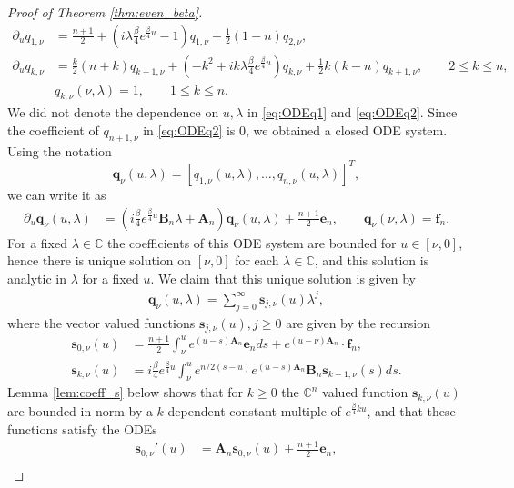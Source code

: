 \documentclass[12pt]{article}
\theoremstyle{definition} %
\newcommand{\CC}{{\mathbb C}}
\theoremstyle{remark} %
\begin{document}
\begin{proof}[Proof of Theorem \ref{thm:even_beta}]
\begin{align}
    \partial_u q_{1,\nu}&=\frac{n+1}{2}+(i \lambda \tfrac{\beta}{4}e^{\frac{\beta}{4}u}-1) q_{1,\nu}+\frac{1}{2}(1-n)q_{2,\nu},\\\label{eq:ODEq2}
    \partial_u q_{k,\nu}&=\frac{k}{2} (n +k) q_{k-1,\nu}+(-k^2 + i k \lambda \tfrac{\beta}{4}e^{\frac{\beta}{4}u})q_{k,\nu}+\frac{1}{2} k (k-n )q_{k+1,\nu}, \qquad 2\le k\le n,\\[3pt]
   &q_{k,\nu}(\nu,\lambda)=1, \qquad 1\le k\le n. 
\end{align}
We did not denote the dependence on $u,\lambda$ in \eqref{eq:ODEq1} and \eqref{eq:ODEq2}. 
Since the coefficient 
of $q_{n+1,\nu}$ in \eqref{eq:ODEq2} is 0,   we obtained a closed ODE system.
Using the notation
\[
\mathbf{q}_{\nu}(u,\lambda)=[q_{1,\nu}(u,\lambda), \dots, q_{n,\nu}(u,\lambda)]^T,
\]
we can write it as 
\begin{align}\label{eq:q_nu_ODE}
     \partial_u \mathbf{q}_\nu(u,\lambda) &= (i \tfrac{\beta}{4}e^{\frac{\beta}{4}u} \mathbf{B}_n \lambda  +\mathbf{A}_n) \mathbf{q}_\nu(u,\lambda) +\frac{n+1}{2}\mathbf{e}_n, \qquad
     \mathbf{q}_{\nu}(\nu,\lambda) = \mathbf{f}_n.
\end{align}
For a fixed $\lambda\in \CC$ the coefficients of this ODE system are bounded for $u\in [\nu,0]$, hence there is unique solution on $[\nu,0]$ for each $\lambda\in \CC$, and this solution is analytic in $\lambda$ for a fixed $u$. We claim that this unique solution is given by 
\begin{align}
    \mathbf{q}_\nu(u,\lambda)=\sum_{j=0}^\infty \mathbf{s}_{j,\nu}(u)\lambda^j,\label{eq:q_nu_series}
\end{align}
where the vector valued functions $\mathbf{s}_{j,\nu}(u),j\ge 0$ are  given by the recursion  
\begin{align}\label{eq:s_nu_def1}
    \mathbf{s}_{0,\nu}(u) &=\frac{n+1}{2}\int_\nu^u e^{(u-s)\mathbf{A}_n} \mathbf{e}_nds+e^{(u-\nu) \mathbf{A}_n }\cdot \mathbf{f}_n,\\
    \mathbf{s}_{k,\nu}(u) &= i \frac{\beta}{4}e^{\frac{\beta}{4} u}\int_\nu^ue^{n/2 (s-u)}e^{(u-s)\mathbf{A}_n}\mathbf{B}_n \mathbf{s}_{k-1,\nu}(s)ds.\label{eq:s_nu_def2}
\end{align}
Lemma \ref{lem:coeff_s} below shows that for $k\ge 0$ the $\CC^n$ valued function $\mathbf{s}_{k,\nu}(u)$ are bounded in norm by a $k$-dependent constant multiple of $e^{\frac{\beta}{4} k u}$, and that these functions satisfy the ODEs
\begin{align}\label{eq:coeff_s_ode1}
     \mathbf{s}_{0,\nu}'(u)&= \mathbf{A}_n  \mathbf{s}_{0,\nu}(u)+ \frac{n+1}{2}\mathbf{e}_n,\\

\end{align}
\end{proof}
\end{document}
